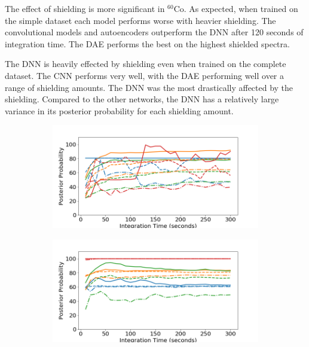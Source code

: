 The effect of shielding is more significant in $^{60}$Co. As expected, when trained on the simple dataset each model performs worse with heavier shielding. The convolutional models and autoencoders outperform the DNN after 120 seconds of integration time. The DAE performs the best on the highest shielded spectra.  

The DNN is heavily effected by shielding even when trained on the complete dataset. The CNN performs very well, with the DAE performing well over a range of shielding amounts. The DNN was the most drastically affected by the shielding. Compared to the other networks, the DNN has a relatively large variance in its posterior probability for each shielding amount.

\begin{figure}[H]
     \centering
     \begin{subfigure}[b]{0.49\textwidth}
         \centering
         \includegraphics[width=\textwidth]{images/iron-co60-easy.png}
         \caption{}
         \label{fig:iron-co60-easy}
     \end{subfigure}
     \hfill
     \begin{subfigure}[b]{0.49\textwidth}
         \centering
         \includegraphics[width=\textwidth]{images/iron-co60-full.png}

\end{subfigure}
\end{figure}
